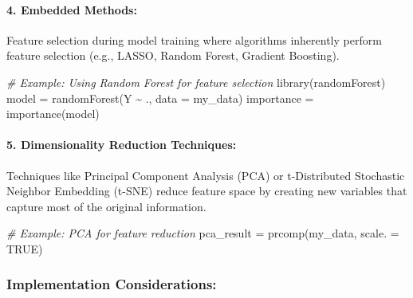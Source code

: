 \documentclass[
]{article}
\newenvironment{Shaded}{}{}
\newcommand{\AttributeTok}[1]{\textcolor[rgb]{0.49,0.56,0.16}{#1}}
\newcommand{\CommentTok}[1]{\textcolor[rgb]{0.38,0.63,0.69}{\textit{#1}}}
\newcommand{\ConstantTok}[1]{\textcolor[rgb]{0.53,0.00,0.00}{#1}}
\newcommand{\FunctionTok}[1]{\textcolor[rgb]{0.02,0.16,0.49}{#1}}
\newcommand{\NormalTok}[1]{#1}
\newcommand{\OtherTok}[1]{\textcolor[rgb]{0.00,0.44,0.13}{#1}}
\newcommand{\SpecialCharTok}[1]{\textcolor[rgb]{0.25,0.44,0.63}{#1}}
\begin{document}
\hypertarget{4-embedded-methods}{%
\paragraph{\texorpdfstring{4. \textbf{Embedded
Methods:}}{4. Embedded Methods:}}\label{4-embedded-methods}}

Feature selection during model training where algorithms inherently
perform feature selection (e.g., LASSO, Random Forest, Gradient
Boosting).

\begin{Shaded}
\begin{Highlighting}[]
\CommentTok{\# Example: Using Random Forest for feature selection}
\FunctionTok{library}\NormalTok{(randomForest)}
\NormalTok{model }\OtherTok{=} \FunctionTok{randomForest}\NormalTok{(Y }\SpecialCharTok{\textasciitilde{}}\NormalTok{ ., }\AttributeTok{data =}\NormalTok{ my\_data)}
\NormalTok{importance }\OtherTok{=} \FunctionTok{importance}\NormalTok{(model)}
\end{Highlighting}
\end{Shaded}

\hypertarget{5-dimensionality-reduction-techniques}{%
\paragraph{\texorpdfstring{5. \textbf{Dimensionality Reduction
Techniques:}}{5. Dimensionality Reduction Techniques:}}\label{5-dimensionality-reduction-techniques}}

Techniques like Principal Component Analysis (PCA) or t-Distributed
Stochastic Neighbor Embedding (t-SNE) reduce feature space by creating
new variables that capture most of the original information.

\begin{Shaded}
\begin{Highlighting}[]
\CommentTok{\# Example: PCA for feature reduction}
\NormalTok{pca\_result }\OtherTok{=} \FunctionTok{prcomp}\NormalTok{(my\_data, }\AttributeTok{scale. =} \ConstantTok{TRUE}\NormalTok{)}
\end{Highlighting}
\end{Shaded}

\hypertarget{implementation-considerations}{%
\subsubsection{Implementation
Considerations:}\label{implementation-considerations}}
\end{document}
